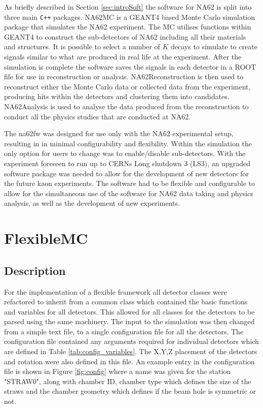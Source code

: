 \documentclass[../../main.tex]{subfiles}
\begin{document}
    As briefly described in Section \ref{sec:introSoft} the software for NA62 is split into three main \sloppy\texttt{C++} packages. 
    NA62MC is a GEANT4 based Monte Carlo simulation package that simulates the NA62 experiment. The MC utilises functions within GEANT4 to construct the sub-detectors of NA62 including all their materials and structures. It is possible to select a number of $K$ decays to simulate to create signals similar to what are produced in real life at the experiment. After the simulation is complete the software saves the signals in each detector in a ROOT file for use in reconstruction or analysis. 
    NA62Reconstruction is then used to reconstruct either the Monte Carlo data or collected data from the experiment, producing hits within the detectors and clustering them into candidates. NA62Analysis is used to analyse the data produced from the reconstruction to conduct all the physics studies that are conducted at NA62. 

    The na62fw was designed for use only with the NA62 experimental setup, resulting in in minimal configurability and flexibility. Within the simulation the only option for users to change was to enable/disable sub-detectors. With the experiment foreseen to run up to CERNs Long shutdown 3 (LS3), an upgraded software package was needed to allow for the development of new detectors for the future kaon experiments. 
    The software had to be flexible and configurable to allow for the simultaneous use of the software for NA62 data taking and physics analysis, as well as the development of new experiments.
    \section{FlexibleMC}
    \subsection{Description}
    For the implementation of a flexible framework all detector classes were refactored to inherit from a common class which contained the basic functions and variables for all detectors. This allowed for all classes for the detectors to be parsed using the same machinery. The input to the simulation was then changed from a simple text file, to a single configuration file for all the detectors. The configuration file contained any arguments required for individual detectors which are defined in Table \ref{tab:config_variables}. The X,Y,Z placement of the detectors and rotation were also defined in this file. 
    An example entry in the configuration file is shown in Figure \ref{fig:config} where a name was given for the station "STRAW0", along with chamber ID, chamber type which defines the size of the straws and the chamber geometry which defines if the beam hole is symmetric or not.  
\end{document}

